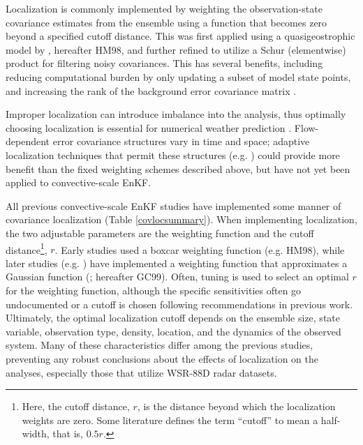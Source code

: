 Localization is commonly implemented by weighting the observation-state covariance estimates from the ensemble using a function that becomes zero beyond a specified cutoff distance. This was first applied using a quasigeostrophic model by \citet{houtekamermitchell98}, hereafter HM98, and further refined to utilize a Schur (elementwise) product for filtering noisy covariances. This has several benefits, including reducing computational burden by only updating a subset of model state points, and increasing the rank of the background error covariance matrix \citep{hamilletal01}.

Improper localization can introduce imbalance into the analysis, thus optimally choosing localization is essential for numerical weather prediction \citep{greybushetal11}. Flow-dependent error covariance structures vary in time and space; adaptive localization techniques that permit these structures (e.g. \citealt{bishophodyss09a,bishophodyss09b}) could provide more benefit than the fixed weighting schemes described above, but have not yet been applied to convective-scale EnKF.

All previous convective-scale EnKF studies have implemented some manner of covariance localization (Table \ref{covlocsummary}). When implementing localization, the two adjustable parameters are the weighting function and the cutoff distance\footnote{Here, the cutoff distance, \(r\), is the distance beyond which the localization weights are zero. Some literature defines the term “cutoff” to mean a half-width, that is, \(0.5r\).}, \( r \). Early studies used a boxcar weighting function (e.g. HM98), while later studies (e.g. \citealt{houtekamermitchell01}) have implemented a weighting function that approximates a Gaussian function (\citealt{gasparicohn99}; hereafter GC99). Often, tuning is used to select an optimal \( r \) for the weighting function, although the specific sensitivities often go undocumented or a cutoff is chosen following recommendations in previous work. Ultimately, the optimal localization cutoff depends on the ensemble size, state variable, observation type, density, location, and the dynamics of the observed system. Many of these characteristics differ among the previous studies, preventing any robust conclusions about the effects of localization on the analyses, especially those that utilize WSR-88D radar datasets.

